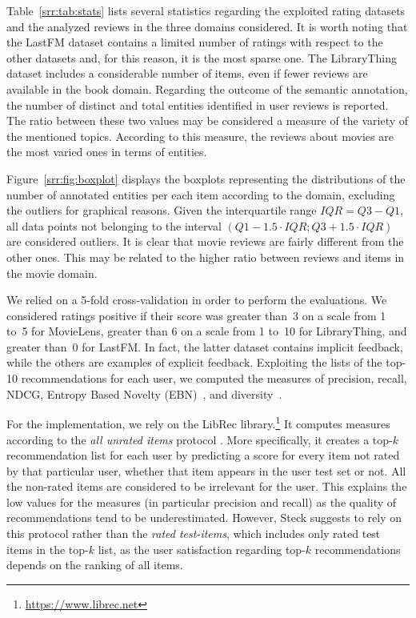 Table~\ref{srr:tab:stats} lists several statistics regarding the exploited rating datasets and the analyzed reviews in the three domains considered. It is worth noting that the LastFM dataset contains a limited number of ratings with respect to the other datasets and, for this reason, it is the most sparse one. The LibraryThing dataset includes a considerable number of items, even if fewer reviews are available in the book domain. Regarding the outcome of the semantic annotation, the number of distinct and total entities identified in user reviews is reported. The ratio between these two values may be considered a measure of the variety of the mentioned topics. According to this measure, the reviews about movies are the most varied ones in terms of entities.

Figure~\ref{srr:fig:boxplot} displays the boxplots representing the distributions of the number of annotated entities per each item according to the domain, excluding the outliers for graphical reasons. Given the interquartile range $IQR = Q3 - Q1$, all data points not belonging to the interval $(Q1 - 1.5 \cdot IQR; Q3 + 1.5 \cdot IQR)$ are considered outliers. It is clear that movie reviews are fairly different from the other ones. This may be related to the higher ratio between reviews and items in the movie domain.

We relied on a 5-fold cross-validation in order to perform the evaluations. We considered ratings positive if their score was greater than~3 on a scale from 1 to~5 for MovieLens, greater than 6 on a scale from 1 to~10 for LibraryThing, and greater than~0 for LastFM. In fact, the latter dataset contains implicit feedback, while the others are examples of explicit feedback. Exploiting the lists of the top-10 recommendations for each user, we computed the measures of precision, recall, NDCG, Entropy Based Novelty (EBN)~\cite{Bellogin2010}, and diversity~\cite{Zhang2008}.

For the implementation, we rely on the LibRec library.\footnote{\url{https://www.librec.net}} It computes measures according to the \emph{all unrated items} protocol \cite{Steck2013}. More specifically, it creates a top-$k$ recommendation list for each user by predicting a score for every item not rated by that particular user, whether that item appears in the user test set or not. All the non-rated items are considered to be irrelevant for the user. This explains the low values for the measures (in particular precision and recall) as the quality of recommendations tend to be underestimated. However, Steck \cite{Steck2013} suggests to rely on this protocol rather than the \emph{rated test-items}, which includes only rated test items in the top-$k$ list, as the user satisfaction regarding top-$k$ recommendations depends on the ranking of all items.

